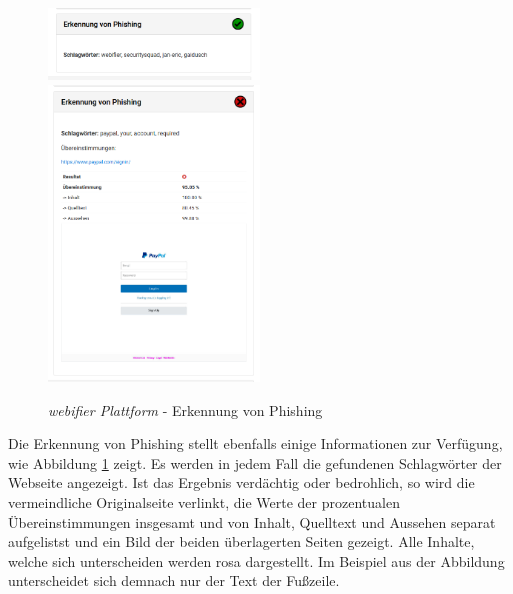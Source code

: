 \begin{figure}[H]
\centerline{%
\includegraphics[width=0.5\textwidth]{images/platform/phishing-clean}%
\includegraphics[width=0.5\textwidth]{images/platform/phishing-malicious}%
}%
\caption{\textit{webifier Plattform} - Erkennung von Phishing}
\label{fig:platform-result-phishingdetector}
\end{figure}

Die Erkennung von Phishing stellt ebenfalls einige Informationen zur Verfügung, wie Abbildung \ref{fig:platform-result-phishingdetector} zeigt. Es werden in jedem Fall die gefundenen Schlagwörter der Webseite angezeigt. Ist das Ergebnis verdächtig oder bedrohlich, so wird die vermeindliche Originalseite verlinkt, die Werte der prozentualen Übereinstimmungen insgesamt und von Inhalt, Quelltext und Aussehen separat aufgelistst und ein Bild der beiden überlagerten Seiten gezeigt. Alle Inhalte, welche sich unterscheiden werden rosa dargestellt. Im Beispiel aus der Abbildung unterscheidet sich demnach nur der Text der Fußzeile.

